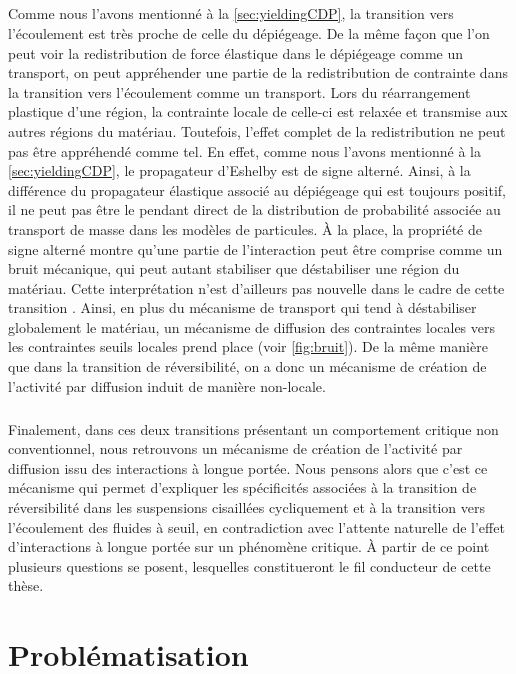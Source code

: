 \subparagraph{}Comme nous l'avons mentionné à la \autoref{sec:yieldingCDP}, la transition vers l'écoulement est très proche de celle du dépiégeage. De la même façon que l'on peut voir la redistribution de force élastique dans le dépiégeage comme un transport, on peut appréhender une partie de la redistribution de contrainte dans la transition vers l'écoulement comme un transport. Lors du réarrangement plastique d'une région, la contrainte locale de celle-ci est relaxée et transmise aux autres régions du matériau. Toutefois, l'effet complet de la redistribution ne peut pas être appréhendé comme tel. En effet, comme nous l'avons mentionné à la \autoref{sec:yieldingCDP}, le propagateur d'Eshelby est de signe alterné. Ainsi, à la différence du propagateur élastique associé au dépiégeage qui est toujours positif, il ne peut pas être le pendant direct de la distribution de probabilité associée au transport de masse dans les modèles de particules. \`A la place, la propriété de signe alterné montre qu'une partie de l'interaction peut être comprise comme un bruit mécanique, qui peut autant stabiliser que déstabiliser une région du matériau. Cette interprétation n'est d'ailleurs pas nouvelle dans le cadre de cette transition \cite{lin_mean-field_2016, ferrero_criticality_2019}. Ainsi, en plus du mécanisme de transport qui tend à déstabiliser globalement le matériau, un mécanisme de diffusion des contraintes locales vers les contraintes seuils locales prend place (voir \autoref{fig:bruit}). De la même manière que dans la transition de réversibilité, on a donc un mécanisme de création de l'activité par diffusion induit de manière non-locale.

\subparagraph{}Finalement, dans ces deux transitions présentant un comportement critique non conventionnel, nous retrouvons un mécanisme de création de l'activité par diffusion issu des interactions à longue portée. Nous pensons alors que c'est ce mécanisme qui permet d'expliquer les spécificités associées à la transition de réversibilité dans les suspensions cisaillées cycliquement et à la transition vers l'écoulement des fluides à seuil, en contradiction avec l'attente naturelle de l'effet d'interactions à longue portée sur un phénomène critique. \`A partir de ce point plusieurs questions se posent, lesquelles constitueront le fil conducteur de cette thèse.

\section{Problématisation}

